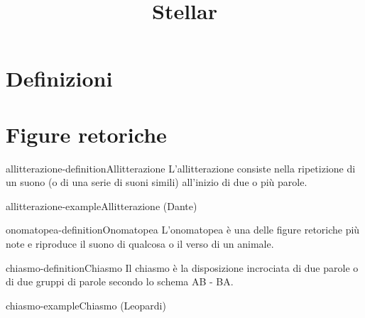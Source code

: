 \documentclass[preview]{standalone}
\begin{document}
\title{Stellar}
\genpage

\section{Definizioni}


\section{Figure retoriche}

\begin{snippetdefinition}{allitterazione-definition}{Allitterazione}
    L'allitterazione consiste nella ripetizione di un suono
    (o di una serie di suoni simili) all'inizio di due o più parole.
\end{snippetdefinition}

\begin{snippetexample}{allitterazione-example}{Allitterazione}
     (Dante)
\end{snippetexample}

\begin{snippetdefinition}{onomatopea-definition}{Onomatopea}
    L'onomatopea è una delle figure retoriche più note e riproduce il suono di qualcosa o il verso di un animale.
\end{snippetdefinition}

\begin{snippetdefinition}{chiasmo-definition}{Chiasmo}
    Il chiasmo è la disposizione incrociata di due parole o di due gruppi di parole secondo lo schema AB - BA.
\end{snippetdefinition}

\begin{snippetexample}{chiasmo-example}{Chiasmo}
     (Leopardi)
\end{snippetexample}



\end{document}
